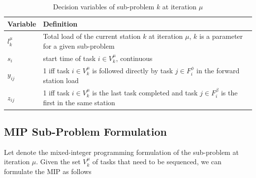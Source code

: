 \begin{table}[tbp]
	\def\arraystretch{1.1}
	\centering
	\caption{Decision variables of sub-problem $k$ at iteration $\mu$}
	\vspace{2mm}
	\begin{tabular}{lp{}}
		\toprule
		Variable & Definition \\\midrule\midrule
		$l_k^\mu$ & Total load of the current station $k$ at iteration $\mu$, $k$ is a parameter for a given sub-problem \\
		$s_i$ & start time of task $i\in V_k^\mu$, continuous \\
		$y_{ij}$ & 1 iff task $i \in V_k^\mu$ is followed directly by task $j \in F_i^\phi$ in the forward station load \\
		$z_{ij}$ & 1 iff task $i \in V_k^\mu$ is the last task completed and task $j \in F_i^\beta$ is the first in the same station \\
		\bottomrule
	\end{tabular}
	\label{tab:bend:SPvars}
\end{table}

\subsection{MIP Sub-Problem Formulation}
\label{sec:bend:mipForm}
Let \spmip{\mu} denote the mixed-integer programming
formulation of the sub-problem at iteration $\mu$.
Given the set $V_k^\mu$ of tasks that need to be sequenced,
we can formulate the MIP as follows

